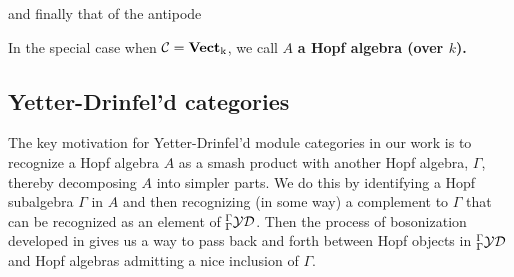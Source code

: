 \documentclass[12pt]{article}
\begin{document}
\begin{center}
    \qquad
    \qquad
\end{center}
and finally that of the antipode
\begin{center}
\end{center}

In the special case when $\mathcal{C}=\operatorname{\mathbf{Vect}_k}$, we call $A$ \textbf{a Hopf algebra (over $k$).}

\subsection{Yetter-Drinfel'd categories}
The key motivation for Yetter-Drinfel'd module categories in our work is to recognize a Hopf algebra $A$ as a smash product with another Hopf algebra, $\Gamma$, thereby decomposing $A$ into simpler parts. We do this by identifying a Hopf subalgebra $\Gamma$ in $A$ and then recognizing (in some way) a complement to $\Gamma$ that can be recognized as an element of ${^\Gamma_\Gamma\mathcal{YD}}$. Then the process of bosonization developed in \cite{majid-bosonization} gives us a way to pass back and forth between Hopf objects in ${^\Gamma_\Gamma\mathcal{YD}}$ and Hopf algebras admitting a nice inclusion of $\Gamma$.
\end{document}
